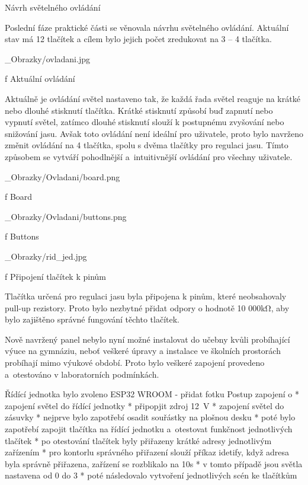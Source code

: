 \chap Návrh světelného ovládání


Poslední fáze praktické části se věnovala návrhu světelného ovládání. Aktuální stav má 12 tlačítek a
cílem bylo jejich počet zredukovat na 3 -- 4 tlačítka.

\medskip {}
\picw=10cm _Obrazky/ovladani.jpg
\caption/f Aktuální ovládání
\medskip


Aktuálně je ovládání světel nastaveno tak, že každá řada světel reaguje na krátké nebo dlouhé stisknutí tlačítka.
Krátké stisknutí způsobí buď zapnutí nebo vypnutí světel, zatímco dlouhé stisknutí slouží k postupnému zvyšování nebo snižování jasu.
Avšak toto ovládání není ideální pro uživatele, proto bylo navrženo změnit ovládání na 4 tlačítka, spolu s dvěma tlačítky pro regulaci jasu.
Tímto způsobem se vytváří pohodlnější a~intuitivnější ovládání pro všechny uživatele.

\medskip {}
\picw=10cm _Obrazky/Ovladani/board.png
\caption/f Board
\medskip

\medskip {}
\picw=10cm _Obrazky/Ovladani/buttons.png
\caption/f Buttons
\medskip

\medskip {}
\picw=10cm _Obrazky/rid_jed.jpg
\caption/f Připojení tlačítek k pinům
\medskip


Tlačítka určená pro regulaci jasu byla připojena k pinům, které neobsahovaly pull-up rezistory.
Proto bylo nezbytné přidat odpory o hodnotě 10 000kΩ, aby bylo zajištěno správné fungování těchto tlačítek.

Nově navržený panel nebylo nyní možné instalovat do učebny kvůli probíhající výuce na gymnáziu, neboť veškeré úpravy
a instalace ve školních prostorách probíhají mimo výukové období. Proto bylo veškeré zapojení provedeno a~otestováno v laboratorních podmínkách.

\medskip
\noindent
Řídící jednotka bylo zvoleno ESP32 WROOM - přidat fotku
\noindent
{\sbf Postup zapojení}
\begitems \style o
* zapojení světel do řídící jednotky
* připopjit zdroj 12~V
* zapojení světel do zásuvky
* nejprve bylo zapotřebí osadit souřástky na plošnou desku
* poté bylo zapotřebí zapojit tlačítka na řídící jednotku a~otestovat funkčnost jednotlivých tlačítek
* po otestování tlačítek byly přiřazeny krátké adresy jednotlivým zařízením
* pro kontorlu správného přiřazení slouží příkaz idetify, když adresa byla správně přiřazena, zařízení se rozblikalo na 10s
* v tomto případě jsou světla nastavena od 0 do 3
* poté následovalo vytvoření jednotlivých scén ke tlačítkům
\enditems

